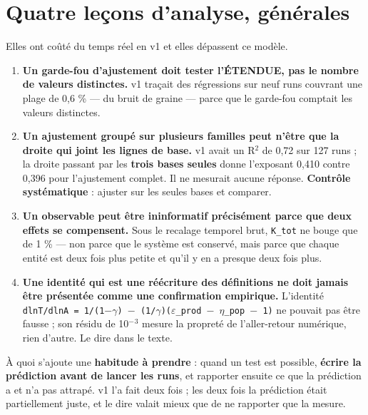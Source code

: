 \documentclass[11pt,a4paper]{article}
\newcommand{\code}[1]{\texttt{#1}}
\begin{document}
\bigskip

\setcounter{section}{13}
\section{Quatre leçons d'analyse, générales}

Elles ont coûté du temps réel en v1 et elles dépassent ce modèle.

\begin{enumerate}
\item \textbf{Un garde-fou d'ajustement doit tester l'ÉTENDUE, pas le nombre de valeurs distinctes.} v1 traçait des régressions sur neuf runs couvrant une plage de 0,6 \% --- du bruit de graine --- parce que le garde-fou comptait les valeurs distinctes.
\item \textbf{Un ajustement groupé sur plusieurs familles peut n'être que la droite qui joint les lignes de base.} v1 avait un R\ensuremath{^2} de 0,72 sur 127 runs ; la droite passant par les \textbf{trois bases seules} donne l'exposant 0,410 contre 0,396 pour l'ajustement complet. Il ne mesurait aucune réponse. \textbf{Contrôle systématique} : ajuster sur les seules bases et comparer.
\item \textbf{Un observable peut être ininformatif précisément parce que deux effets se compensent.} Sous le recalage temporel brut, \code{K\_tot} ne bouge que de 1 \% --- non parce que le système est conservé, mais parce que chaque entité est deux fois plus petite et qu'il y en a presque deux fois plus.
\item \textbf{Une identité qui est une réécriture des définitions ne doit jamais être présentée comme une confirmation empirique.} L'identité \code{dlnT/dlnA = 1/(1\ensuremath{-}\ensuremath{\gamma}) \ensuremath{-} (1/\ensuremath{\gamma})(\ensuremath{\varepsilon}\_prod \ensuremath{-} \ensuremath{\eta}\_pop \ensuremath{-} 1)} ne pouvait pas être fausse ; son résidu de 10\ensuremath{^-}\ensuremath{^3} mesure la propreté de l'aller-retour numérique, rien d'autre. Le dire dans le texte.
\end{enumerate}

À quoi s'ajoute une \textbf{habitude à prendre} : quand un test est possible, \textbf{écrire la prédiction avant de lancer les runs}, et rapporter ensuite ce que la prédiction a et n'a pas attrapé. v1 l'a fait deux fois ; les deux fois la prédiction était partiellement juste, et le dire valait mieux que de ne rapporter que la mesure.

\bigskip
\end{document}
